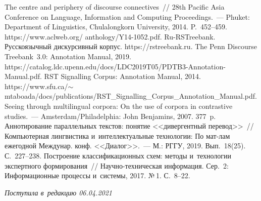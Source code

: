 \begin{multicols}{2}
{{\begin{thebibliography}{99}
 The centre and periphery of 
discourse connectives~// 28th Pacific Asia Conference on Language, Information and 
Computing Proceedings.~--- Phuket: Department of Linguistics, Chulalongkorn University, 
2014. P.~452--459. {\sf https://www.aclweb.org/ anthology/Y14-1052.pdf}.
Ru-RSTreebank. Русскоязычный дискурсивный корпус. {\sf https://rstreebank.ru}.
 The Penn Discourse Treebank~3.0: Annotation 
Manual, 2019. {\sf https://\linebreak catalog.ldc.upenn.edu/docs/LDC2019T05/PDTB3-Annotation-Manual.pdf}.
 RST Signalling Corpus: Annotation Manual, 2014. {\sf 
https://www.sfu.ca/$\sim$mtaboada/docs/\linebreak publications/RST\_Signalling\_Corpus\_Annotation\_\linebreak Manual.pdf}.
 Seeing through multilingual corpora: On the use of corpora in contrastive 
studies.~--- Amsterdam/Philadelphia: John Benjamins, 2007. 377~p.
 Аннотирование параллельных текстов: понятие <<дивергентный 
перевод>>~// Компьютерная лингвистика и~интеллектуальные технологии: По мат-лам 
ежегодной Междунар. конф. <<Диалог>>.~--- М.: РГГУ, 2019. Вып.~18(25). С.~227--238.
 По\-стро\-ение классификационных схем: 
методы и~технологии экспертного формирования~// На\-уч\-но-тех\-ни\-че\-ская 
информация. Сер.~2: Информационные процессы и~сис\-те\-мы, 2017. №\,1. С.~8--22.
 \end{thebibliography}

}
}

\end{multicols}

\vspace*{-3pt}

\hfill{\small\textit{Поступила в~редакцию 06.04.2021}}



\newpage

\vspace*{-28pt}




